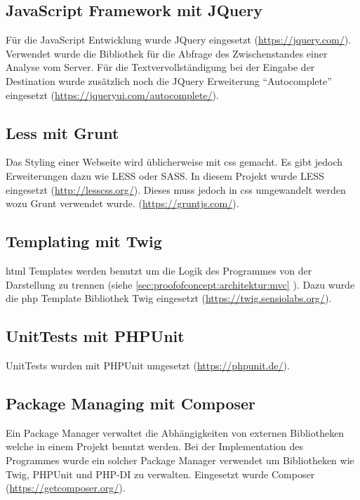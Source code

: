 \subsection{JavaScript Framework mit JQuery}
Für die JavaScript Entwicklung wurde JQuery eingesetzt (\url{https://jquery.com/}). Verwendet wurde die Bibliothek für die Abfrage des Zwischenstandes einer Analyse vom Server. Für die Textvervollständigung bei der Eingabe der Destination wurde zusätzlich noch die JQuery Erweiterung "`Autocomplete"' eingesetzt (\url{https://jqueryui.com/autocomplete/}).

\subsection{Less mit Grunt}
Das Styling einer Webseite wird üblicherweise mit \gls{css} gemacht. Es gibt jedoch Erweiterungen dazu wie LESS oder SASS. In diesem Projekt wurde LESS eingesetzt (\url{http://lesscss.org/}). Dieses muss jedoch in \gls{css} umgewandelt werden wozu Grunt verwendet wurde. (\url{https://gruntjs.com/}).

\subsection{Templating mit Twig}
\label{sec:proofofconcept:externebibliotheken:twig}
\gls{html} Templates werden benutzt um die Logik des Programmes von der Darstellung zu trennen (siehe \cref{sec:proofofconcept:architektur:mvc} ). Dazu wurde die \gls{php} Template Bibliothek Twig eingesetzt (\url{https://twig.sensiolabs.org/}).

\subsection{UnitTests mit PHPUnit}
UnitTests wurden mit PHPUnit umgesetzt (\url{https://phpunit.de/}).

\subsection{Package Managing mit Composer}
Ein Package Manager verwaltet die Abhängigkeiten von externen Bibliotheken welche in einem Projekt benutzt werden. Bei der Implementation des Programmes wurde ein solcher Package Manager verwendet um Bibliotheken wie Twig, PHPUnit und PHP-DI zu verwalten. Eingesetzt wurde Composer (\url{https://getcomposer.org/}).

